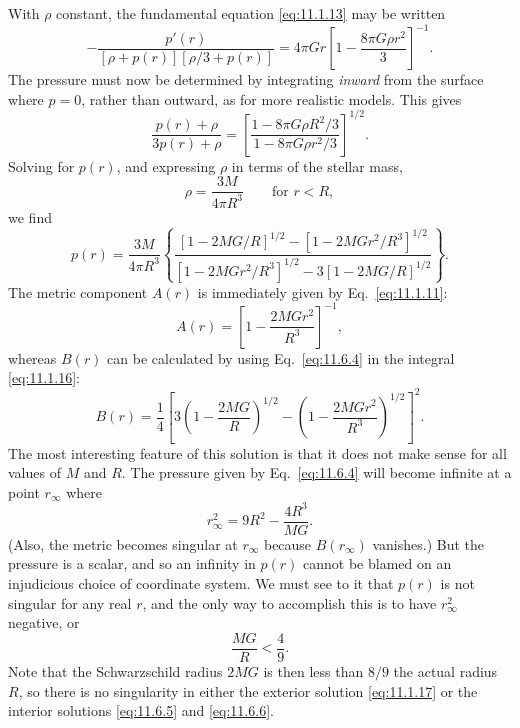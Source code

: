 With \(\rho\) constant, the fundamental equation \eqref{eq:11.1.13} may be
written
\begin{equation}
  -\frac{p'(r)}
  {[\rho+p(r)][\rho/3+p(r)]}
  =
  4\pi Gr
  \left[1-\frac{8\pi G\rho r^2}{3}\right]^{-1}.
  \tag{11.6.2}\label{eq:11.6.2}
\end{equation}
The pressure must now be determined by integrating \emph{inward} from the
surface where \(p=0\), rather than outward, as for more realistic models. This
gives
\[
  \frac{p(r)+\rho}{3p(r)+\rho}
  =
  \left[
    \frac{1-8\pi G\rho R^2/3}
    {1-8\pi G\rho r^2/3}
  \right]^{1/2}.
\]
Solving for \(p(r)\), and expressing \(\rho\) in terms of the stellar mass,
\begin{equation}
  \rho=\frac{3M}{4\pi R^3}\qquad\text{for }r<R,
  \tag{11.6.3}\label{eq:11.6.3}
\end{equation}
we find
\begin{equation}
  p(r)
  =
  \frac{3M}{4\pi R^3}
  \left\{
    \frac{
      [1-2MG/R]^{1/2}
      -[1-2MGr^2/R^3]^{1/2}
    }{
      [1-2MGr^2/R^3]^{1/2}
      -3[1-2MG/R]^{1/2}
    }
  \right\}.
  \tag{11.6.4}\label{eq:11.6.4}
\end{equation}
The metric component \(A(r)\) is immediately given by
Eq.~\eqref{eq:11.1.11}:
\begin{equation}
  A(r)=\left[1-\frac{2MGr^2}{R^3}\right]^{-1},
  \tag{11.6.5}\label{eq:11.6.5}
\end{equation}
whereas \(B(r)\) can be calculated by using Eq.~\eqref{eq:11.6.4} in the
integral \eqref{eq:11.1.16}:
\begin{equation}
  B(r)
  =
  \frac14
  \left[
    3\left(1-\frac{2MG}{R}\right)^{1/2}
    -\left(1-\frac{2MGr^2}{R^3}\right)^{1/2}
  \right]^2.
  \tag{11.6.6}\label{eq:11.6.6}
\end{equation}
The most interesting feature of this solution is that it does not make sense
for all values of \(M\) and \(R\). The pressure given by
Eq.~\eqref{eq:11.6.4} will become infinite at a point \(r_\infty\) where
\begin{equation}
  r_\infty^2=9R^2-\frac{4R^3}{MG}.
  \tag{11.6.7}\label{eq:11.6.7}
\end{equation}
(Also, the metric becomes singular at \(r_\infty\) because
\(B(r_\infty)\) vanishes.) But the pressure is a scalar, and so an infinity
in \(p(r)\) cannot be blamed on an injudicious choice of coordinate system.
We must see to it that \(p(r)\) is not singular for any real \(r\), and the
only way to accomplish this is to have \(r_\infty^2\) negative, or
\begin{equation}
  \frac{MG}{R}<\frac49.
  \tag{11.6.8}\label{eq:11.6.8}
\end{equation}
Note that the Schwarzschild radius \(2MG\) is then less than \(8/9\) the
actual radius \(R\), so there is no singularity in either the exterior
solution \eqref{eq:11.1.17} or the interior solutions
\eqref{eq:11.6.5} and \eqref{eq:11.6.6}.

